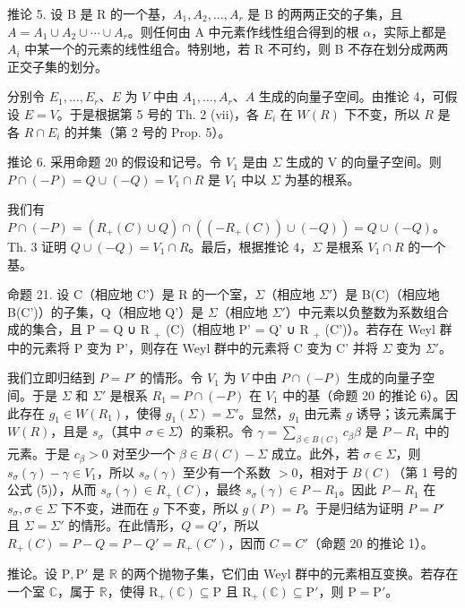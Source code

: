 推论 5. 设 B 是 R 的一个基，\(A_{1}, A_{2}, \ldots, A_{r}\) 是 B 的两两正交的子集，且 \(A = A_{1} \cup A_{2} \cup \cdots \cup A_{r}\)。则任何由 A 中元素作线性组合得到的根 \(\alpha\)，实际上都是 \(A_{i}\) 中某一个的元素的线性组合。特别地，若 R 不可约，则 B 不存在划分成两两正交子集的划分。

分别令 \(E_1, \ldots, E_r\)、\(E\) 为 \(V\) 中由 \(A_1, \ldots, A_r\)、\(A\) 生成的向量子空间。由推论 4，可假设 \(E = V\)。于是根据第 5 号的 Th. 2 (vii)，各 \(E_i\) 在 \(W(R)\) 下不变，所以 \(R\) 是各 \(R \cap E_i\) 的并集（第 2 号的 Prop. 5）。

推论 6. 采用命题 20 的假设和记号。令 \(V_{1}\) 是由 \(\Sigma\) 生成的 V 的向量子空间。则 \(P \cap (-P) = Q \cup (-Q) = V_{1} \cap R\) 是 \(V_{1}\) 中以 \(\Sigma\) 为基的根系。

我们有 \(P \cap (-P) = (R_{+}(C) \cup Q) \cap ((-R_{+}(C)) \cup (-Q)) = Q \cup (-Q)\)。Th. 3 证明 \(Q \cup (-Q) = V_{1} \cap R\)。最后，根据推论 4，\(\Sigma\) 是根系 \(V_{1} \cap R\) 的一个基。

命题 21. 设 C（相应地 C'）是 R 的一个室，\(\Sigma\)（相应地 \(\Sigma'\)）是 B(C)（相应地 B(C')）的子集，Q（相应地 Q'）是 \(\Sigma\)（相应地 \(\Sigma'\)）中元素以负整数为系数组合成的集合，且 P = Q ∪ R \(_{+}\) (C)（相应地 P' = Q' ∪ R \(_{+}\) (C')）。若存在 Weyl 群中的元素将 P 变为 P'，则存在 Weyl 群中的元素将 C 变为 C' 并将 \(\Sigma\) 变为 \(\Sigma'\)。

我们立即归结到 \(P = P'\) 的情形。令 \(V_1\) 为 \(V\) 中由 \(P \cap (-P)\) 生成的向量子空间。于是 \(\Sigma\) 和 \(\Sigma'\) 是根系 \(R_1 = P \cap (-P)\) 在 \(V_1\) 中的基（命题 20 的推论 6）。因此存在 \(g_1 \in W(R_1)\)，使得 \(g_1(\Sigma) = \Sigma'\)。显然，\(g_1\) 由元素 \(g\) 诱导；该元素属于 \(W(R)\)，且是 \(s_\sigma\)（其中 \(\sigma \in \Sigma\)）的乘积。令 \(\gamma = \sum_{\beta \in B(C)} c_\beta \beta\) 是 \(P - R_1\) 中的元素。于是 \(c_\beta > 0\) 对至少一个 \(\beta \in B(C) - \Sigma\) 成立。此外，若 \(\sigma \in \Sigma\)，则 \(s_\sigma(\gamma) - \gamma \in V_1\)，所以 \(s_\sigma(\gamma)\) 至少有一个系数 \(> 0\)，相对于 \(B(C)\)（第 1 号的公式 (5)），从而 \(s_\sigma(\gamma) \in R_+(C)\)，最终 \(s_\sigma(\gamma) \in P - R_1\)。因此 \(P - R_1\) 在 \(s_\sigma, \sigma \in \Sigma\) 下不变，进而在 \(g\) 下不变，所以 \(g(P) = P\)。于是归结为证明 \(P = P'\) 且 \(\Sigma = \Sigma'\) 的情形。在此情形，\(Q = Q'\)，所以 \(R_+(C) = P - Q = P - Q' = R_+(C')\)，因而 \(C = C'\)（命题 20 的推论 1）。

推论。设 \(\mathrm{P}, \mathrm{P}'\) 是 \(\mathbb{R}\) 的两个抛物子集，它们由 Weyl 群中的元素相互变换。若存在一个室 \(\mathbb{C}\)，属于 \(\mathbb{R}\)，使得 \(\mathrm{R}_{+}(\mathbb{C}) \subseteq \mathrm{P}\) 且 \(\mathrm{R}_{+}(\mathbb{C}) \subseteq \mathrm{P}'\)，则 \(\mathrm{P} = \mathrm{P}'\)。

